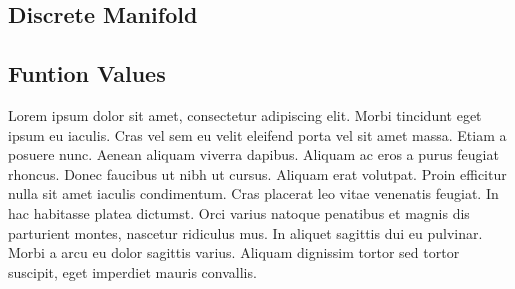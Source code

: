 \subsection{Discrete Manifold}
%
\subsection{Funtion Values}
Lorem ipsum dolor sit amet, consectetur adipiscing elit. Morbi tincidunt eget 
ipsum eu iaculis. Cras vel sem eu velit eleifend porta vel sit amet massa. Etiam 
a posuere nunc. Aenean aliquam viverra dapibus. Aliquam ac eros a purus feugiat 
rhoncus. Donec faucibus ut nibh ut cursus. Aliquam erat volutpat. Proin efficitur 
nulla sit amet iaculis condimentum. Cras placerat leo vitae venenatis feugiat. In 
hac habitasse platea dictumst. Orci varius natoque penatibus et magnis dis 
parturient montes, nascetur ridiculus mus. In aliquet sagittis dui eu pulvinar. 
Morbi a arcu eu dolor sagittis varius. Aliquam dignissim tortor sed tortor 
suscipit, eget imperdiet mauris convallis.~\cite[p.~00]{todoCitation}\todoCitation
%

